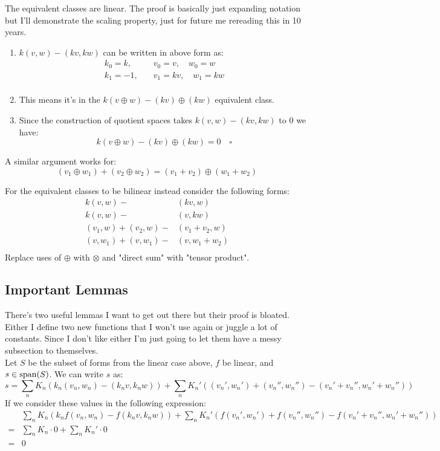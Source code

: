 The equivalent classes are linear.
The proof is basically just expanding notation but I'll demonstrate the scaling property,
just for future me rereading this in 10 years.
\begin{enumerate}
	\item $k(v,w)-(kv,kw)$ can be written in above form as:
		\begin{equation*}
		\begin{aligned}
			k_0=k,&\quad v_0=v,\quad w_0=w\\
			k_1=-1,&\quad v_1=kv,\quad w_1=kw\\
		\end{aligned}
		\end{equation*}
	\item This means it's in the $k(v\oplus w) - (kv)\oplus(kw)$ equivalent class.
	\item Since the construction of quotient spaces takes $k(v,w)-(kv,kw)$ to $0$ we have:
		\[k(v\oplus w) - (kv)\oplus(kw) = 0\quad\square\]
\end{enumerate}
A similar argument works for:
\[(v_1\oplus w_1)+(v_2\oplus w_2) = (v_1+v_2)\oplus (w_1+w_2)\]

For the equivalent classes to be bilinear instead consider the following forms:
\begin{equation*}
\begin{aligned}
	k(v,w) -& (kv,w)\\
	k(v,w) -& (v,kw)\\
	(v_1,w)+(v_2,w) -& (v_1+v_2,w)\\
	(v,w_1)+(v,w_1) -& (v,w_1+w_2)\\
\end{aligned}
\end{equation*}
Replace uses of $\oplus$ with $\otimes$ and "direct sum" with "tensor product".

\subsection{Important Lemmas}
There's two useful lemmas I want to get out there but their proof is bloated.
Either I define two new functions that I won't use again or juggle a lot of constants.
Since I don't like either I'm just going to let them have a messy subsection to themselves.
\\

Let $S$ be the subset of forms from the linear case above, $f$ be linear, and $s \in \operatorname{span}(S)$.
We can write $s$ as:
\[s =\sum_nK_n(k_n(v_n,w_n)-(k_nv,k_nw))+\sum_nK_n'((v_n',w_n')+(v_n'',w_n'')-(v_n'+v_n'',w_n'+w_n''))\]
If we consider these values in the following expression:
\begin{equation*}
\begin{aligned}
	&\sum_nK_n(k_nf(v_n,w_n)-f(k_nv,k_nw))+\sum_nK_n'(f(v_n',w_n')+f(v_n'',w_n'')-f(v_n'+v_n'',w_n'+w_n'')) \\
	=&\sum_nK_n\cdot0+\sum_nK_n'\cdot0 \\
	=&0\\
\end{aligned}
\end{equation*}

